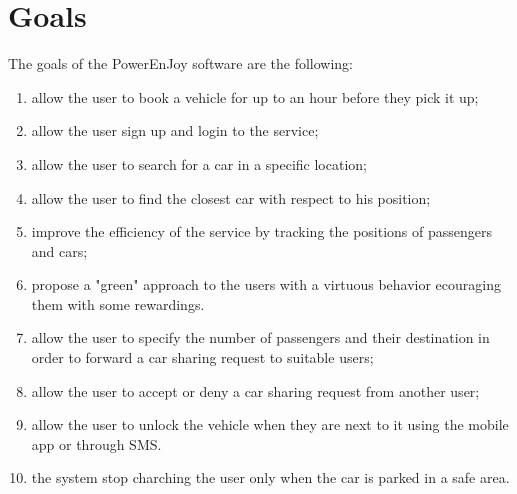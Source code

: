 \section{Goals}
The goals of the PowerEnJoy software are the following:
\begin{enumerate}
	\item allow the user to book a vehicle for up to an hour before they pick it up; \label{g-simplify}
	\item allow the user sign up and login to the service;  \label{g-login}	
	\item allow the user to search for a car in a specific location;  \label{g-taxicall}
	\item allow the user to find the closest car with respect to his position;  \label{g-reserve}
	\item improve the efficiency of the service by tracking the positions of passengers and cars;  \label{g-position}
	\item propose a "green" approach to the users with a virtuous behavior ecouraging them with some rewardings. \label{g-share}
	\item allow the user to specify the number of passengers and their destination in order to forward a car sharing request to suitable users;
	\item allow the user to accept or deny a car sharing request from another user;
	\item allow the user to unlock the vehicle when they are next to it using the mobile app or through SMS.
	\item the system stop charching the user only when the car is parked in a safe area.
\end{enumerate}